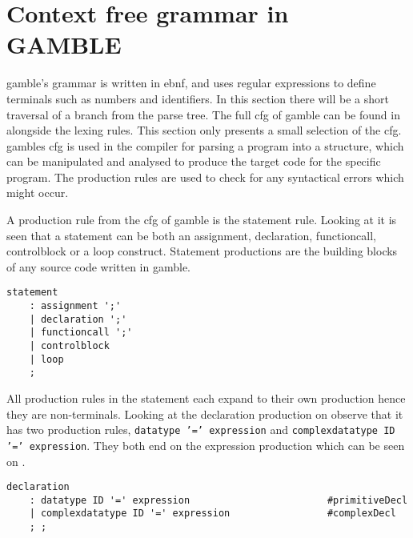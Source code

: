 \section{Context free grammar in GAMBLE}
\gls{gamble}'s grammar is written in \acrfull{ebnf}, and uses regular expressions to define terminals such as numbers and identifiers.
In this section there will be a short traversal of a branch from the parse tree.
The full \acrshort{cfg} of \gls{gamble} can be found in  alongside the lexing rules.
This section only presents a small selection of the \acrshort{cfg}.
\gls{gamble}s \acrshort{cfg} is used in the compiler for parsing a program into a structure, which can be manipulated and analysed to produce the target code for the specific program.
The production rules are used to check for any syntactical errors which might occur.

A production rule from the \acrshort{cfg} of \gls{gamble} is the statement rule. 
Looking at  it is seen that a statement can be both an assignment, declaration, functioncall, controlblock or a loop construct. 
Statement productions are the building blocks of any source code written in \gls{gamble}.

\begin{lstlisting}[caption={\acrshort{cfg} Statement},frame=tlrb,label={lst:statements},numbers=none]
statement
    : assignment ';'
    | declaration ';'
    | functioncall ';'
    | controlblock 
    | loop
    ;
\end{lstlisting}

All production rules in the statement each expand to their own production hence they are non-terminals.
Looking at the declaration production on  observe that it has two production rules, \texttt{datatype '=' expression} and \texttt{complexdatatype ID '=' expression}. 
They both end on the expression production which can be seen on .

\begin{lstlisting}[caption={\acrshort{cfg} Declaration},frame=tlrb,label={lst:declaration},numbers=none]
declaration
    : datatype ID '=' expression                        #primitiveDecl
    | complexdatatype ID '=' expression                 #complexDecl
    ; ;
\end{lstlisting}

